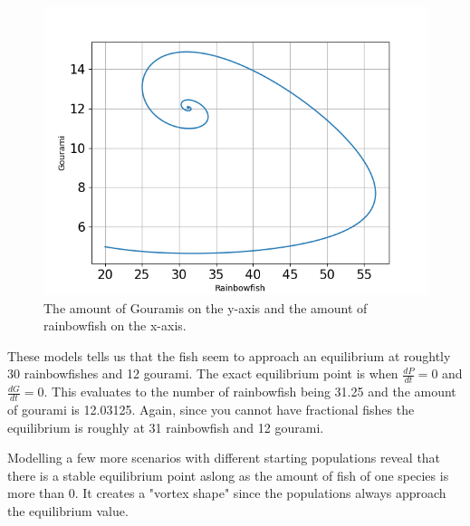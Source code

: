 \begin{figure}[H]
    \includegraphics[scale=0.4]{../figures/Figure_3.png}
    \centering
    \caption{The amount of Gouramis on the y-axis and the amount of
        rainbowfish on the x-axis.}
\end{figure}

\begin{flushleft}
    These models tells us that the fish seem to approach an equilibrium at roughtly
    30 rainbowfishes and 12 gourami. The exact equilibrium point is when $\frac{dP}{dt}=0$ and $\frac{dG}{dt}=0$.
    This evaluates to the number of rainbowfish being 31.25 and the amount of gourami is 12.03125. Again, since you
    cannot have fractional fishes the equilibrium is roughly at 31 rainbowfish and 12 gourami.

\end{flushleft}

\begin{flushleft}
    Modelling a few more scenarios with different
    starting populations reveal that there is a stable equilibrium point aslong as
    the amount of fish of one species is more than 0. It creates a "vortex shape"
    since the populations always approach the equilibrium value.
\end{flushleft}

